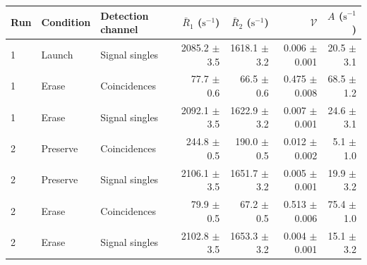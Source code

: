 \begin{tabular}{lllrrrr}
\toprule
Run & Condition & Detection channel & $\bar R_1$ ($\mathrm{s}^{-1}$) & $\bar R_2$ ($\mathrm{s}^{-1}$) & $\mathcal{V}$ & $A$ ($\mathrm{s}^{-1}$) \\
\midrule
1 & Launch & Signal singles & 2085.2 \ensuremath{\pm} 3.5 & 1618.1 \ensuremath{\pm} 3.2 & 0.006 \ensuremath{\pm} 0.001 & 20.5 \ensuremath{\pm} 3.1 \\
1 & Erase & Coincidences & 77.7 \ensuremath{\pm} 0.6 & 66.5 \ensuremath{\pm} 0.6 & 0.475 \ensuremath{\pm} 0.008 & 68.5 \ensuremath{\pm} 1.2 \\
1 & Erase & Signal singles & 2092.1 \ensuremath{\pm} 3.5 & 1622.9 \ensuremath{\pm} 3.2 & 0.007 \ensuremath{\pm} 0.001 & 24.6 \ensuremath{\pm} 3.1 \\
2 & Preserve & Coincidences & 244.8 \ensuremath{\pm} 0.5 & 190.0 \ensuremath{\pm} 0.5 & 0.012 \ensuremath{\pm} 0.002 & 5.1 \ensuremath{\pm} 1.0 \\
2 & Preserve & Signal singles & 2106.1 \ensuremath{\pm} 3.5 & 1651.7 \ensuremath{\pm} 3.2 & 0.005 \ensuremath{\pm} 0.001 & 19.9 \ensuremath{\pm} 3.2 \\
2 & Erase & Coincidences & 79.9 \ensuremath{\pm} 0.5 & 67.2 \ensuremath{\pm} 0.5 & 0.513 \ensuremath{\pm} 0.006 & 75.4 \ensuremath{\pm} 1.0 \\
2 & Erase & Signal singles & 2102.8 \ensuremath{\pm} 3.5 & 1653.3 \ensuremath{\pm} 3.2 & 0.004 \ensuremath{\pm} 0.001 & 15.1 \ensuremath{\pm} 3.2 \\
\bottomrule
\end{tabular}
